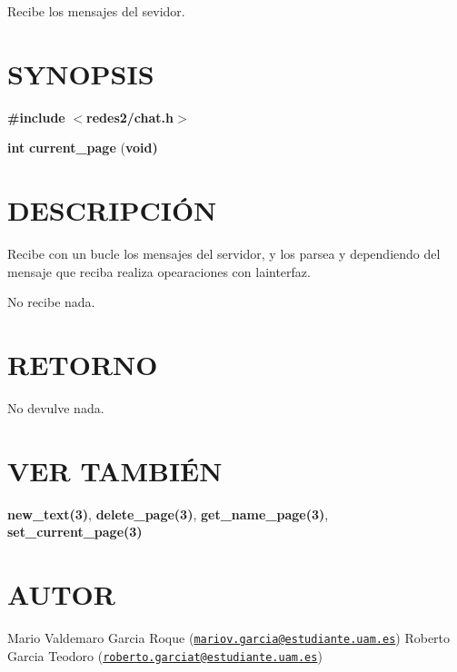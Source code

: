 Recibe los mensajes del sevidor.\hypertarget{getTamanoFichero_SYNOPSIS}{}\section{S\-Y\-N\-O\-P\-S\-I\-S}\label{getTamanoFichero_SYNOPSIS}
{\bfseries \#include} {\bfseries $<$redes2/chat.\-h$>$} 

{\bfseries int} {\bfseries current\-\_\-page} {\bfseries }({\bfseries void{\bfseries })} \hypertarget{getTamanoFichero_descripcion}{}\section{D\-E\-S\-C\-R\-I\-P\-C\-IÓ\-N}\label{getTamanoFichero_descripcion}
Recibe con un bucle los mensajes del servidor, y los parsea y dependiendo del mensaje que reciba realiza opearaciones con lainterfaz.

No recibe nada.\hypertarget{getTamanoFichero_retorno}{}\section{R\-E\-T\-O\-R\-N\-O}\label{getTamanoFichero_retorno}
No devulve nada.\hypertarget{servidorArchivo_seealso}{}\section{V\-E\-R T\-A\-M\-B\-IÉ\-N}\label{servidorArchivo_seealso}
{\bfseries new\-\_\-text(3)}, {\bfseries delete\-\_\-page(3)}, {\bfseries get\-\_\-name\-\_\-page(3)}, {\bfseries set\-\_\-current\-\_\-page(3)} \hypertarget{getTamanoFichero_authors}{}\section{A\-U\-T\-O\-R}\label{getTamanoFichero_authors}
Mario Valdemaro Garcia Roque (\href{mailto:mariov.garcia@estudiante.uam.es}{\tt mariov.\-garcia@estudiante.\-uam.\-es}) Roberto Garcia Teodoro (\href{mailto:roberto.garciat@estudiante.uam.es}{\tt roberto.\-garciat@estudiante.\-uam.\-es}) 